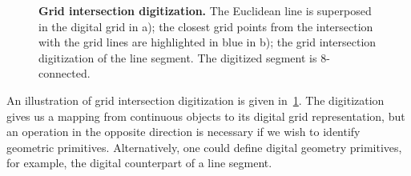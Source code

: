 \begin{figure}
{}
\caption{\textbf{Grid intersection digitization.} The Euclidean line is superposed in the digital grid in a); the closest grid points from the intersection with the grid lines are highlighted in blue in b); the grid intersection digitization of the line segment. The digitized segment is $8$-connected.}
\label{ch5:fig:grid-intersection-digitization}
\end{figure}

An illustration of grid intersection digitization is given in~\cref{ch5:fig:grid-intersection-digitization}. The digitization gives us a mapping from continuous objects to its digital grid representation, but an operation in the opposite direction is necessary if we wish to identify geometric primitives. Alternatively, one could define digital geometry primitives, for example, the digital counterpart of a line segment.

